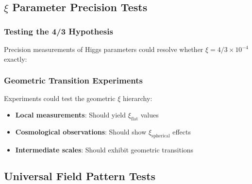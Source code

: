 	\subsection{$\xi$ Parameter Precision Tests}
	\label{subsec:xi_precision_tests}
	
	\subsubsection{Testing the 4/3 Hypothesis}
	\label{subsubsec:testing_four_thirds}
	
	Precision measurements of Higgs parameters could resolve whether $\xi = 4/3 \times 10^{-4}$ exactly:
	
	\begin{table}[htbp]
		\centering
		\caption{Precision requirements for testing $\xi = 4/3$ hypothesis}
		\label{tab:precision_requirements}
	\end{table}
	
	\subsubsection{Geometric Transition Experiments}
	\label{subsubsec:geometric_transitions}
	
	Experiments could test the geometric $\xi$ hierarchy:
	\begin{itemize}
		\item \textbf{Local measurements}: Should yield $\xi_{\text{flat}}$ values
		\item \textbf{Cosmological observations}: Should show $\xi_{\text{spherical}}$ effects
		\item \textbf{Intermediate scales}: Should exhibit geometric transitions
	\end{itemize}
	
	\subsection{Universal Field Pattern Tests}
	\label{subsec:field_pattern_tests}
	
